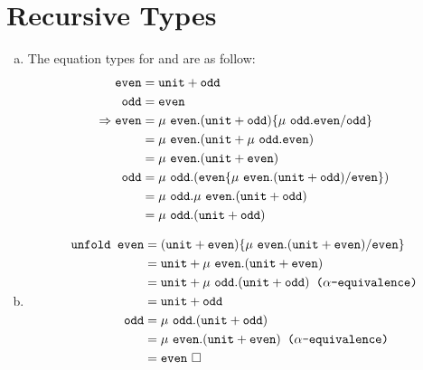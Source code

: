 \section{Recursive Types}
\begin{enumerate}[(a)]
\item The equation types for \even and \odd are as follow:
  \begin{align*}
  \even &= \unit + \odd\\
  \odd &= \even\\
  \Rightarrow \even &= \mu~\even. (\unit + \odd) \{\mu~\odd.\even/\odd\}\\
  &= \mu~\even. (\unit + \mu~\odd. \even)\\
  &= \mu~\even.(\unit + \even)\\
  \odd &= \mu~\odd.(\even \{\mu~\even .(\unit + \odd) / \even\})\\
  &= \mu~\odd. \mu~\even. (\unit + \odd)\\
  &= \mu~\odd.(\unit + \odd)
  \end{align*}
\item
\begin{align*}
  \texttt{unfold }\even &= (\unit + \even) \{\mu~\even.(\unit + \even)  / \even\}\\
  &= \unit + \mu~\even.(\unit + \even)\\
  &= \unit + \mu~\odd.(\unit + \odd) \texttt{ ($\alpha$-equivalence)}\\
  &= \unit + \odd\\
  \odd &=  \mu~\odd.(\unit + \odd)\\
  &= \mu~\even.(\unit + \even)\texttt{ ($\alpha$-equivalence)}\\
  &= \even~\Box
  \end{align*}
\end{enumerate}